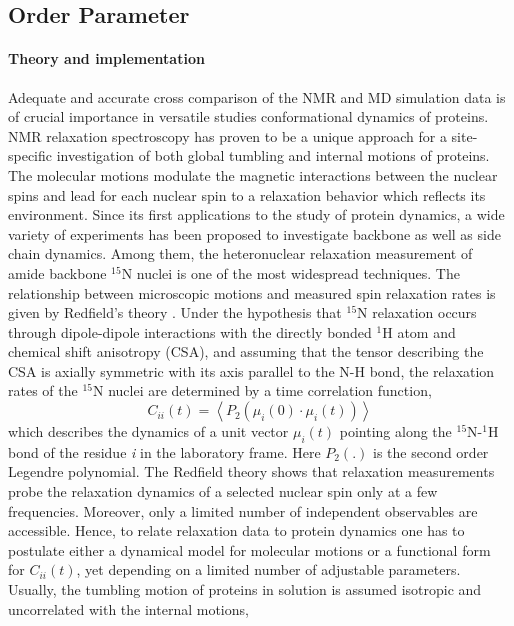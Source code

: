 \documentclass[a4paper,11pt]{article}
\begin{document}
\subsection{Order Parameter}
\label{op}
\paragraph{Theory and implementation\\}
\label{op_theory}
Adequate and accurate cross comparison of the NMR and \gls{MD} simulation data is of crucial importance in versatile studies
conformational dynamics of proteins. NMR relaxation spectroscopy has proven to be a unique approach for a site-specific
investigation of both global tumbling and internal motions of proteins. The molecular motions modulate the magnetic 
interactions between the nuclear spins and lead for each nuclear spin to a relaxation behavior which reflects its environment. 
Since its first applications to the study of protein dynamics, a wide variety of experiments has been proposed to 
investigate backbone as well as side chain dynamics. Among them, the heteronuclear relaxation measurement of amide 
backbone $^{15}$N nuclei is one of the most widespread techniques. The relationship between microscopic motions and measured
spin relaxation rates is given by Redfield's theory \cite{Refield}. Under the hypothesis that $^{15}$N relaxation occurs through 
dipole-dipole interactions with the directly bonded $^{1}$H atom and chemical shift anisotropy (CSA), and assuming that the 
tensor describing the CSA is axially symmetric with its axis parallel to the N-H bond, the relaxation rates of the $^{15}$N 
nuclei are determined by a time correlation function,
\begin{equation}
\label{eq:op_cii}
C_{ii}(t) = \left\langle P_2(\mu_i(0) \cdot \mu_i(t)) \right\rangle
\end{equation}
which describes the dynamics of a unit vector $\mu_i(t)$ pointing along the $^{15}$N-$^{1}$H bond of the residue \textit{i} in the laboratory 
frame. Here $P_2(.)$ is the second order Legendre polynomial.
The Redfield theory shows that relaxation measurements probe the relaxation dynamics of a selected nuclear spin only at a 
few frequencies. Moreover, only a limited number of independent observables are accessible. Hence, to relate relaxation 
data to protein dynamics one has to postulate either a dynamical model for molecular motions or a functional form 
for $C_{ii}(t)$, yet depending on a limited number of adjustable parameters.
Usually, the tumbling motion of proteins in solution is assumed isotropic and uncorrelated with the internal motions, 
\end{document}
